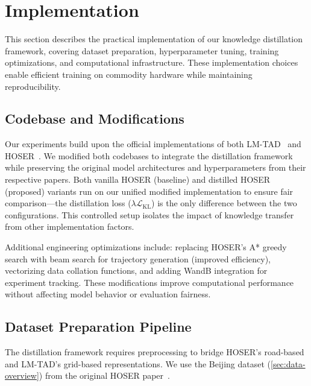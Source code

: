 
\section{Implementation}
\label{sec:implementation}

This section describes the practical implementation of our knowledge distillation framework, covering dataset preparation, hyperparameter tuning, training optimizations, and computational infrastructure. These implementation choices enable efficient training on commodity hardware while maintaining reproducibility.

\subsection{Codebase and Modifications}
\label{sec:impl-codebase}

Our experiments build upon the official implementations of both LM-TAD~\cite{mbuyaTrajectoryAnomalyDetection2024,JonathankabalaLMTAD} and HOSER~\cite{caoHolisticSemanticRepresentation2025,HOSEREvaluationMainipynb}. We modified both codebases to integrate the distillation framework while preserving the original model architectures and hyperparameters from their respective papers. Both vanilla HOSER (baseline) and distilled HOSER (proposed) variants run on our unified modified implementation to ensure fair comparison---the distillation loss ($\lambda \mathcal{L}_{\text{KL}}$) is the only difference between the two configurations. This controlled setup isolates the impact of knowledge transfer from other implementation factors.

Additional engineering optimizations include: replacing HOSER's A* greedy search with beam search for trajectory generation (improved efficiency), vectorizing data collation functions, and adding WandB integration for experiment tracking. These modifications improve computational performance without affecting model behavior or evaluation fairness.

\subsection{Dataset Preparation Pipeline}
\label{sec:impl-dataset-prep}

The distillation framework requires preprocessing to bridge HOSER's road-based and LM-TAD's grid-based representations. We use the Beijing dataset (\autoref{sec:data-overview}) from the original HOSER paper~\cite{caoHolisticSemanticRepresentation2025}.

